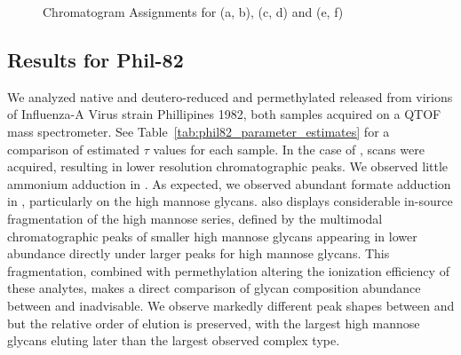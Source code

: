 \begin{figure}[htb]
\begin{minipage}{1\linewidth}
\begin{subfigure}[b]{0.49\linewidth}
                \subcaption{
                    \label{fig:agp_assignment:f}
                }
            \end{subfigure}
        \end{minipage}
        \caption{Chromatogram Assignments for \agp (a, b), \dpagp (c, d) and \rpagp (e, f)
            \label{fig:agp_assignments}
        }
    \end{figure}
    \FloatBarrier

\subsection{Results for Phil-82}

    We analyzed native and deutero-reduced and permethylated \nglycans released from
    virions of Influenza-A Virus strain Phillipines 1982, both samples acquired on a QTOF
    mass spectrometer. See Table~\ref{tab:phil82_parameter_estimates}
    for a comparison of estimated $\tau$ values for each sample. In the case of \dpphil,
    \msn scans were acquired, resulting in lower resolution chromatographic peaks. We observed
    little ammonium adduction in \dpphil. As expected, we observed abundant formate adduction in
    \phil, particularly on the high mannose glycans. \dpphil also displays considerable in-source
    fragmentation of the high mannose series, defined by the multimodal chromatographic peaks of
    smaller high mannose glycans appearing in lower abundance directly under larger peaks for
    high mannose glycans. This fragmentation, combined with permethylation altering the ionization
    efficiency of these analytes, makes a direct comparison of glycan composition abundance between
    \phil and \dpphil inadvisable. We observe markedly different peak shapes between \phil and \dpphil
    but the relative order of elution is preserved, with the largest high mannose glycans eluting
    later than the largest observed complex type.

